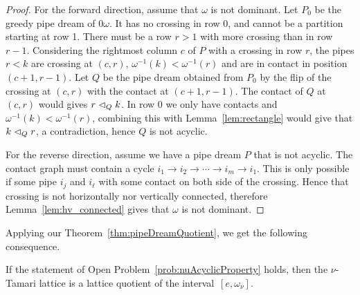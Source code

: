 \begin{proof} For the forward direction, assume that $\omega$ is not dominant. 
Let $P_0$ be the greedy pipe dream of $0\omega$. It has no crossing in row 0, and cannot be a partition starting at row 1.
There must be a row $r>1$ with more crossing than in row $r-1$. 
Considering the rightmost column $c$ of $P$ with a crossing in row $r$,  the pipes $r<k$ are crossing at $(c,r)$, $\omega^{-1}(k)<\omega^{-1}(r)$ and are in contact in position $(c+1,r-1)$.
Let $Q$ be the pipe dream obtained from $P_0$ by the flip of the crossing at $(c,r)$ with the contact at $(c+1,r-1)$.
The contact of $Q$ at $(c,r)$ would gives $r\vartriangleleft_{Q} k$. In row $0$ we only have contacts and $\omega^{-1}(k)<\omega^{-1}(r)$, combining this  with Lemma~\ref{lem:rectangle} would give  that 
$k \vartriangleleft_{Q} r$, a contradiction, hence $Q$ is not acyclic.

For the reverse direction, assume we have a pipe dream $P$ that is not acyclic. The contact graph must contain a cycle $i_1 \to i_2\to\cdots\to i_m\to i_1$.
This is only possible if some pipe $i_j$ and $i_\ell$ with some contact on both side of the crossing.
Hence that crossing is not horizontally nor vertically connected, therefore Lemma~\ref{lem:hv_connected} gives that $\omega$ is not dominant.
\end{proof}

Applying our Theorem~\ref{thm:pipeDreamQuotient}, we get the following consequence.

\begin{corollary}
If the statement of Open Problem~\ref{prob:nuAcyclicProperty} holds, then the $\nu$-Tamari lattice is a lattice quotient of the interval~$[e,\omega_\nu]$.
\end{corollary}  
